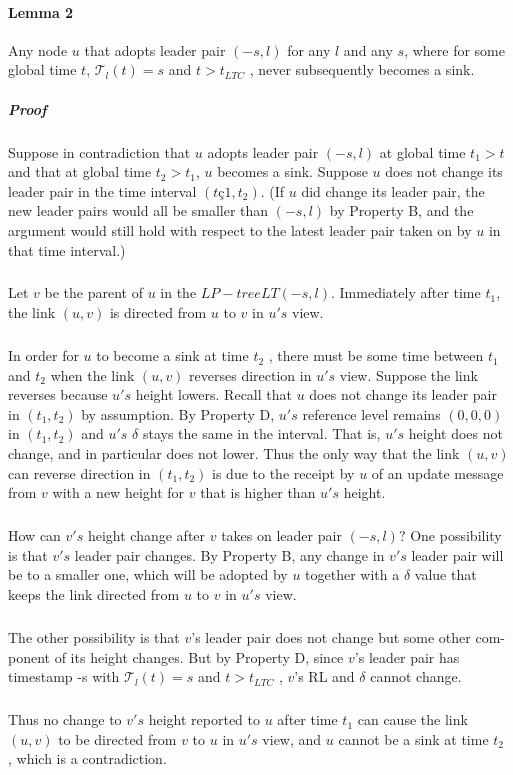 \paragraph{Lemma 2}Any node $u$ that adopts leader pair $(-s, l)$ for any $l$ and any $s$, where for some global time $t$, $\mathcal{T}_l (t) = s$ and $t > t_{LTC}$ , never subsequently becomes a sink.
\subparagraph{Proof}Suppose in contradiction that $u$ adopts leader pair $(-s, l)$ at global time $t_1 > t$ and that at global time $t_2 > t_1$, $u$ becomes a sink. Suppose $u$ does not change its leader pair in the time interval $(tç1 ,t_2 )$. (If $u$ did change its leader pair, the new leader pairs would all be smaller than $(-s, l)$ by Property B, and the argument would still hold with respect to the latest leader pair taken on by $u$ in that time interval.)
\subparagraph{}Let $v$ be the parent of $u$ in the $LP-tree LT (-s, l)$. Immediately after time $t_1$, the link $(u, v)$ is directed from $u$ to $v$ in $u's$ view.
\subparagraph{}In order for $u$ to become a sink at time $t_2$ , there must be some time between $t_1$ and $t_2$ when the link $(u, v)$ reverses direction in $u's$ view. Suppose the link reverses because $u's$ height lowers. Recall that $u$ does not change its leader pair in $(t_1,t_2 )$ by assumption. By Property D, $u's$ reference level remains $(0, 0, 0)$ in $(t_1 ,t_2 )$ and $u's$ $\delta$ stays the same in the interval. That is, $u's$ height does not change, and in particular does not lower. Thus the only way that the link $(u, v)$ can reverse direction in $(t_1 ,t_2 )$ is due to the receipt by $u$ of an update message from $v$ with a new height for $v$ that is higher than $u's$ height.
\subparagraph{}How can $v's$ height change after $v$ takes on leader pair $(-s, l)?$ One possibility is that $v's$ leader pair changes. By Property B, any change in $v's$ leader pair will be to a smaller one, which will be adopted by $u$ together with a $\delta$ value that keeps the link directed from $u$ to $v$ in $u's$ view.
\subparagraph{}The other possibility is that $v$'s leader pair does not change but some other com- ponent of its height changes. But by Property D, since $v$'s leader pair has timestamp -s with $\mathcal{T} _l (t) = s$ and $t > t_{LTC}$ , $v$'s RL and $\delta$ cannot change.
\subparagraph{}Thus no change to $v's$ height reported to $u$ after time $t_1$ can cause the link $(u, v)$ to be directed from $v$ to $u$ in $u's$ view, and $u$ cannot be a sink at time $t_2$ , which is a contradiction.
